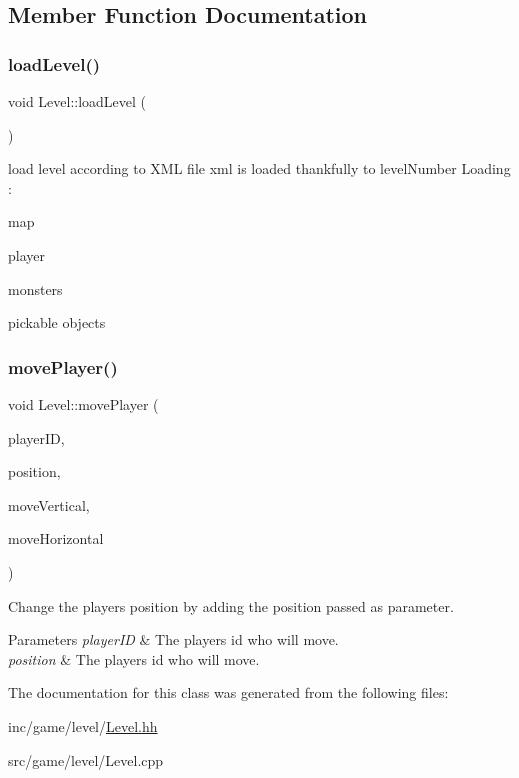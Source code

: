 \subsection{Member Function Documentation}
\mbox{\label{classLevel_aa88db36cd824320cb599d913603dc2a3}} 
\subsubsection{\texorpdfstring{load\+Level()}{loadLevel()}}
{\footnotesize\ttfamily void Level\+::load\+Level (\begin{DoxyParamCaption}{ }\end{DoxyParamCaption})}

load level according to X\+ML file xml is loaded thankfully to level\+Number Loading \+:
\begin{DoxyItemize}
\item map
\item player
\item monsters
\item pickable objects 
\end{DoxyItemize}\mbox{\label{classLevel_a11e0cf9684245fb8ed9b880f7924b38a}} 
\subsubsection{\texorpdfstring{move\+Player()}{movePlayer()}}
{\footnotesize\ttfamily void Level\+::move\+Player (\begin{DoxyParamCaption}\item[{const Unsigned\+Int \&}]{player\+ID,  }\item[{const Vector3d \&}]{position,  }\item[{Float}]{move\+Vertical,  }\item[{Float}]{move\+Horizontal }\end{DoxyParamCaption})}



Change the player\textquotesingle{}s position by adding the position passed as parameter. 


\begin{DoxyParams}{Parameters}
{\em player\+ID} & The player\textquotesingle{}s id who will move. \\
\hline
{\em position} & The player\textquotesingle{}s id who will move. \\
\hline
\end{DoxyParams}


The documentation for this class was generated from the following files\+:\begin{DoxyCompactItemize}
\item 
inc/game/level/\hyperlink{Level_8hh}{Level.\+hh}\item 
src/game/level/Level.\+cpp\end{DoxyCompactItemize}

